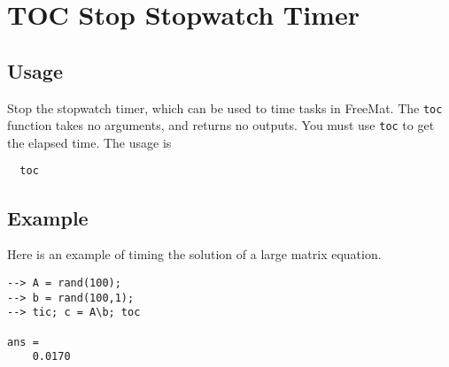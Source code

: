 \section{TOC Stop Stopwatch Timer}

\subsection{Usage}

Stop the stopwatch timer, which can be used to time tasks in FreeMat.
The \verb|toc| function takes no arguments, and returns no outputs.  You must use
\verb|toc| to get the elapsed time.  The usage is
\begin{verbatim}
  toc
\end{verbatim}
\subsection{Example}

Here is an example of timing the solution of a large matrix equation.
\begin{verbatim}
--> A = rand(100);
--> b = rand(100,1);
--> tic; c = A\b; toc

ans = 
    0.0170 
\end{verbatim}
